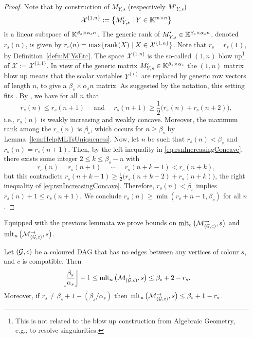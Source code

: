 \begin{proof}
	Note that by construction of $M_{Y,s}$ (respectively $M'_{Y,s}$)
		\[ \mathcal{X}^{ \{1,n\} } := \big\{ M'_{Y,s} \mid Y \in \mathbb K^{m \times n} \big\} \]
	is a linear subspace of $\mathbb K^{\beta_s \times \alpha_s n}$. The generic rank of $M'_{Y,s} \in \mathbb K^{\beta_s \times \alpha_s n}$, denoted $r_s(n)$, is given by $r_s(n) = \max \{ \operatorname{rank}(X) \mid X \in \mathcal{X}^{ \{1,n\} } \}$. Note that $r_s = r_s(1)$, by Definition~\ref{defn:M'YsEtc}.
	The space $\mathcal{X}^{ \{1,n\} }$ is the so-called $(1,n)$ blow up\footnote{This is not related to the blow up construction from Algebraic Geometry, e.g., to resolve singularities.} of $\mathcal{X} := \mathcal{X}^{ \{1,1\} }$. In view of the generic matrix $M'_{Y,s} \in \mathbb K^{\beta_s \times \alpha_s}$ the $(1,n)$ matrix blow up means that the scalar variables $Y^{(i)}$ are replaced by generic row vectors of length $n$, to give a $\beta_s \times \alpha_s n$ matrix.
	As suggested by the notation, this setting fits \cite[Section~2]{derksen2017polynomial}. By \cite[Lemma~2.7 parts~(1) and (3)]{derksen2017polynomial}, we have for all $n$ that
		\begin{equation}\label{eq:rsnIncreasingConcave}
			r_s(n) \leq r_s(n+1) \quad \text{ and } \quad r_s(n + 1) \geq \frac{1}{2} \big( r_s(n) + r_s(n+2) \big),
		\end{equation}
	i.e., $r_s(n)$ is weakly increasing and weakly concave.
	Moreover, the maximum rank among the $r_s(n )$ is $\beta_s$, which occurs for $n \geq \beta_s$ by Lemma~\ref{lem:HelpMLTsUniqueness}.
	Now, let $n$ be such that $r_s(n) < \beta_s$ and $r_s(n) = r_s(n+1)$. Then, by the left inequality in \eqref{eq:rsnIncreasingConcave}, there exists some integer $2 \leq k \leq \beta_s - n$ with
	\[ r_s(n) = r_s(n+1) = \cdots = r_s(n+k-1) < r_s(n+k) , \]
	but this contradicts $ r_s(n + k - 1) \geq \frac{1}{2} \big( r_s(n + k - 2) + r_s(n+k) \big)$, the right inequality of \eqref{eq:rsnIncreasingConcave}. Therefore, $r_s(n) < \beta_s$ implies $r_s(n) +1 \leq r_s(n+1)$. We conclude $ r_s(n) \geq \min ( r_s + n-1, \beta_s)$ for all $n$.
\end{proof}

Equipped with the previous lemmata we prove bounds on $\operatorname{mlt}_e \big(\mathcal{M}_{(\mathcal{G}, c)}^{\to}, s \big)$ and $\operatorname{mlt}_u \big(\mathcal{M}_{(\mathcal{G}, c)}^{\to}, s \big)$.

\begin{prop} \label{prop:boundMltsUniqueness}
	Let $(\mathcal{G}, c)$ be a coloured DAG that has no edges between any vertices of colour $s$, and $c$ is compatible. Then
	\[\left\lfloor \frac{\beta_s}{\alpha_s} \right\rfloor + 1 \leq \operatorname{mlt}_u \big(\mathcal{M}_{(\mathcal{G}, c)}^{\to}, s \big) \leq \beta_s + 2 - r_s. \]
	Moreover, if $r_s \neq \beta_s + 1 - (\beta_s / \alpha_s)$ then $\operatorname{mlt}_u \big( \mathcal{M}_{(\mathcal{G}, c)}^{\to}, s \big) \leq \beta_s + 1 - r_s$.
\end{prop}

